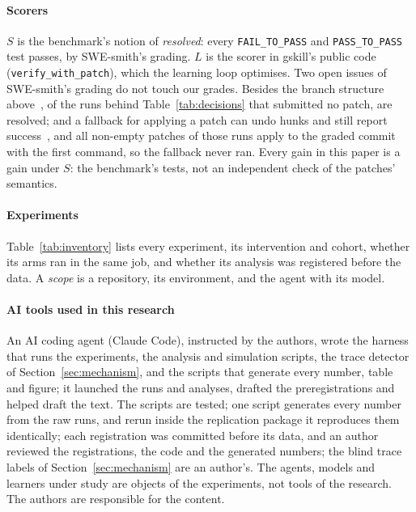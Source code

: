 \documentclass[sigconf,review,anonymous]{acmart}
\begin{document}
\paragraph{Scorers}
{\sloppy $S$ is the benchmark's notion of \emph{resolved}: every \texttt{FAIL\_TO\_PASS} and
\texttt{PASS\_TO\_PASS} test passes, by SWE-smith's grading. $L$ is the scorer in gskill's public
code (\texttt{verify\_with\_patch}), which the learning loop optimises. Two open issues of SWE-smith's
grading do not touch our grades. Besides the branch structure above~\cite{swesmith_issue_252}, of the
\napEmpty{} runs behind Table~\ref{tab:decisions} that submitted no patch, \napEmptyResolved{} are
resolved; and a fallback for applying a patch can undo hunks
and still report success~\cite{swesmith_issue_256}, and all \napApplies{} non-empty patches of those
runs apply to the graded commit with the first command, so the fallback never ran. Every gain in this paper is a
gain under $S$: the benchmark's tests, not an independent check of the patches' semantics.\par}

\paragraph{Experiments}
Table~\ref{tab:inventory} lists every experiment, its intervention and cohort, whether its arms ran
in the same job, and whether its analysis was registered before the data. A \emph{scope} is a
repository, its environment, and the agent with its model.

\paragraph{AI tools used in this research}
An AI coding agent (Claude Code), instructed by the authors, wrote the harness that runs the
experiments, the analysis and simulation scripts, the trace detector of Section~\ref{sec:mechanism},
and the scripts that generate every number, table and figure; it launched the runs and analyses,
drafted the preregistrations and helped draft the text. The scripts are tested; one script
generates every number from the raw runs, and rerun inside the replication package it reproduces
them identically; each registration was committed before its data, and an author reviewed the registrations, the code and the generated
numbers; the blind trace labels of Section~\ref{sec:mechanism} are an author's. The agents, models
and learners under study are objects of the experiments, not tools of the research. The authors are
responsible for the content.
\end{document}
